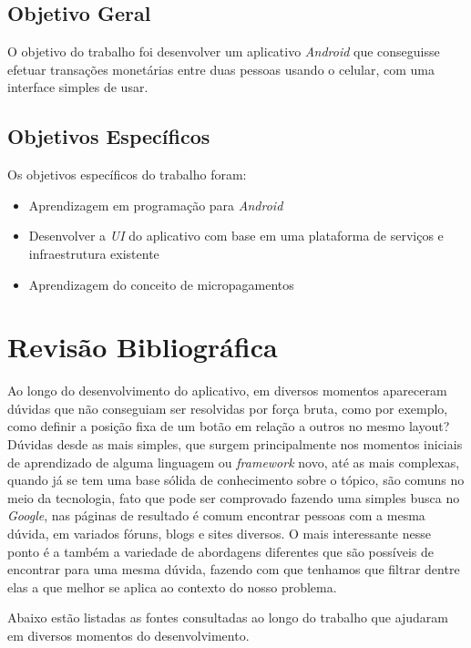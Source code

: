 \documentclass[hidelinks,12pt]{article}
\begin{document}
\subsection{Objetivo Geral}
O objetivo do trabalho foi desenvolver um aplicativo \textit{Android} que conseguisse efetuar transa\c{c}\~oes monet\'arias entre duas pessoas usando o celular, com uma interface simples de usar.
\newline


\subsection{Objetivos Espec\'ificos}
Os objetivos espec\'ificos do trabalho foram:
\begin{itemize}
	\item Aprendizagem em programa\c{c}\~ao para \textit{Android}
	\item Desenvolver a \textit{UI} do aplicativo com base em uma plataforma de servi\c{c}os e infraestrutura existente
	\item Aprendizagem do conceito de micropagamentos
\end{itemize}
\newpage
\section{Revis\~ao Bibliogr\'afica}
Ao longo do desenvolvimento do aplicativo, em diversos momentos apareceram d\'uvidas que n\~ao conseguiam ser resolvidas por for\c{c}a bruta, como por exemplo, como definir a posi\c{c}\~ao fixa de um bot\~ao em rela\c{c}\~ao a outros no mesmo layout? D\'uvidas desde as mais simples, que surgem principalmente nos momentos iniciais de aprendizado de alguma linguagem ou \textit{framework} novo, at\'e as mais complexas, quando j\'a se tem uma base s\'olida de conhecimento sobre o t\'opico, s\~ao comuns no meio da tecnologia, fato que pode ser comprovado fazendo uma simples busca no \textit{Google}, nas p\'aginas de resultado \'e comum encontrar pessoas com a mesma d\'uvida, em variados f\'oruns, blogs e  sites diversos. O mais interessante nesse ponto \'e a tamb\'em a variedade de abordagens diferentes que s\~ao poss\'iveis de encontrar para uma mesma d\'uvida, fazendo com que tenhamos que filtrar dentre elas a que melhor se aplica ao contexto do nosso problema.


Abaixo est\~ao listadas as fontes consultadas ao longo do trabalho que ajudaram em diversos momentos do desenvolvimento.
\newline
\end{document}
